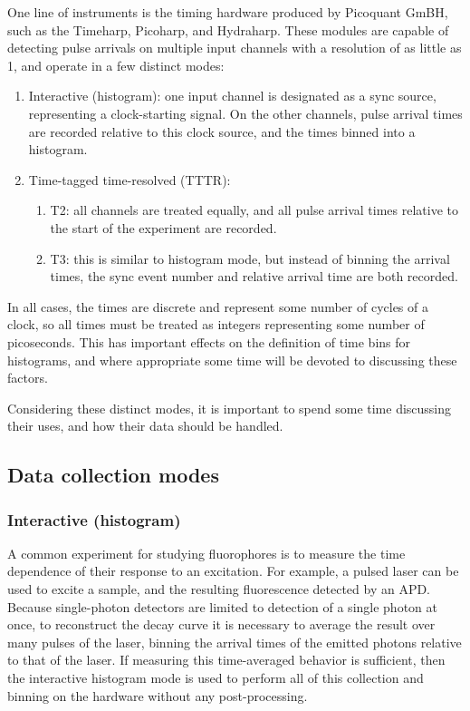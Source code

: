 \documentclass{article}
\begin{document}
One line of instruments is the timing hardware produced by Picoquant GmBH, such as the Timeharp, Picoharp, and Hydraharp. These modules are capable of detecting pulse arrivals on multiple input channels with a resolution of as little as 1\pico\second, and operate in a few distinct modes:
\begin{enumerate}
\item Interactive (histogram): one input channel is designated as a sync source, representing a clock-starting signal. On the other channels, pulse arrival times are recorded relative to this clock source, and the times binned into a histogram. 
\item Time-tagged time-resolved (TTTR): 
	\begin{enumerate}
	\item T2: all channels are treated equally, and all pulse arrival times relative to the start of the experiment are recorded. 
	\item T3: this is similar to histogram mode, but instead of binning the arrival times, the sync event number and relative arrival time are both recorded.
	\end{enumerate}
\end{enumerate}

In all cases, the times are discrete and represent some number of cycles of a clock, so all times must be treated as integers representing some number of picoseconds. This has important effects on the definition of time bins for histograms, and where appropriate some time will be devoted to discussing these factors. 

Considering these distinct modes, it is important to spend some time discussing their uses, and how their data should be handled.

\subsection{Data collection modes}
\label{sec:modes}
\subsubsection{Interactive (histogram)}
A common experiment for studying fluorophores is to measure the time dependence of their response to an excitation. For example, a pulsed laser can be used to excite a sample, and the resulting fluorescence detected by an APD. Because single-photon detectors are limited to detection of a single photon at once, to reconstruct the decay curve it is necessary to average the result over many pulses of the laser, binning the arrival times of the emitted photons relative to that of the laser. If measuring this time-averaged behavior is sufficient, then the interactive histogram mode is used to perform all of this collection and binning on the hardware without any post-processing. 
\end{document}
